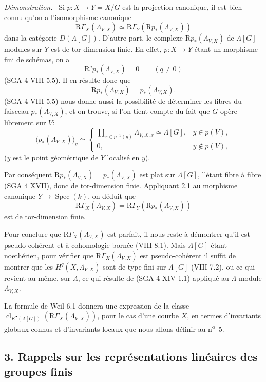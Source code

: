 \documentclass[11pt]{article}
\newenvironment{prooftext}[1][Proof]{\par\noindent\emph{#1.}\ }{\par\medskip}
\DeclareMathOperator{\Spec}{Spec}
\newcommand{\R}{\mathrm{R}}\newcommand{\RHomCore}{\mathrm{RHom}}
\providecommand{\R}{\mathrm R}
\providecommand{\Spec}{\operatorname{Spec}}
\providecommand{\Spec}{\operatorname{Spec}}
\providecommand{\Spec}{\operatorname{Spec}}
\providecommand{\Spec}{\operatorname{Spec}}
\begin{document}
\begin{prooftext}[Démonstration]
Si $p:X\to Y=X/G$ est la projection canonique, il est bien connu qu'on a l'isomorphisme canonique
\[
\R\Gamma_X(\Lambda_{V,X})\simeq \R\Gamma_Y(\R p_*(\Lambda_{V,X}))
\]
dans la catégorie $D(\Lambda[G])$. D'autre part, le complexe $\R p_*(\Lambda_{V,X})$ de $\Lambda[G]$-modules sur $Y$ est de tor-dimension finie. En effet, $p:X\to Y$ étant un morphisme fini de schémas, on a
\[
\R^q p_*(\Lambda_{V,X})=0\qquad(q\ne0)
\]
(SGA 4 VIII 5.5). Il en résulte donc que
\[
\R p_*(\Lambda_{V,X})=p_*(\Lambda_{V,X}).
\]
(SGA 4 VIII 5.5) nous donne aussi la possibilité de déterminer les fibres du faisceau $p_*(\Lambda_{V,X})$, et on trouve, si l'on tient compte du fait que $G$ opère librement sur $V$:
\[
\bigl(p_*(\Lambda_{V,X})\bigr)_{\bar y}\simeq
\begin{cases}
\displaystyle \prod_{x\in p^{-1}(y)}\Lambda_{V,X,\bar x}\simeq \Lambda[G],& y\in p(V),\\[1em]
0,& y\notin p(V),
\end{cases}
\]
($\bar y$ est le point géométrique de $Y$ localisé en $y$).

Par conséquent $\R p_*(\Lambda_{V,X})=p_*(\Lambda_{V,X})$ est plat sur $\Lambda[G]$, l'étant fibre à fibre (SGA 4 XVII), donc de tor-dimension finie. Appliquant 2.1 au morphisme canonique $Y\to\Spec(k)$, on déduit que
\[
\R\Gamma_X(\Lambda_{V,X})=\R\Gamma_Y(\R p_*(\Lambda_{V,X}))
\]
est de tor-dimension finie.

Pour conclure que $\R\Gamma_X(\Lambda_{V,X})$ est parfait, il nous reste à démontrer qu'il est pseudo-cohérent et à cohomologie bornée (VIII 8.1). Mais $\Lambda[G]$ étant noethérien, pour vérifier que $\R\Gamma_X(\Lambda_{V,X})$ est pseudo-cohérent il suffit de montrer que les $H^q(X,\Lambda_{V,X})$ sont de type fini sur $\Lambda[G]$ (VIII 7.2), ou ce qui revient au même, sur $\Lambda$, ce qui résulte de (SGA 4 XIV 1.1) appliqué au $\Lambda$-module $\Lambda_{V,X}$.
\end{prooftext}

La formule de Weil 6.1 donnera une expression de la classe $\operatorname{cl}_{K^\bullet(\Lambda[G])}(\R\Gamma_X(\Lambda_{V,X}))$, pour le cas d'une courbe $X$, en termes d'invariants globaux connus et d'invariants locaux que nous allons définir au n\textsuperscript{o}~5.

\subsection*{3. Rappels sur les représentations linéaires des groupes finis}
\end{document}
